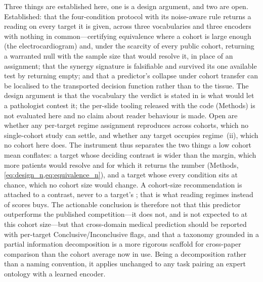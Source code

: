 Three things are established here, one is a design argument, and two
are open. Established: that the four-condition protocol with its
noise-aware rule returns a reading on every target it is given, across
three vocabularies and three encoders with nothing in common---certifying
equivalence where a cohort is large enough (the electrocardiogram) and,
under the scarcity of every public cohort, returning a warranted
null with the sample size that would resolve it, in place of an
assignment; that the synergy signature is falsifiable and survived its
one available test by returning empty; and that a predictor's collapse
under cohort transfer can be localised to the transported decision
function rather than to the tissue. The design argument is that the
vocabulary the verdict is stated in is what would let a pathologist
contest it; the per-slide tooling released with the code (Methods) is
not evaluated here and no claim about reader behaviour is made. Open
are whether any per-target regime assignment reproduces across cohorts,
which no single-cohort study can settle, and whether any target occupies
regime~(ii), which no cohort here does. The instrument thus separates
the two things a low cohort mean conflates: a target whose deciding
contrast is wider than the margin, which more patients would resolve and
for which it returns the number (Methods, \cref{eq:design_n,eq:equivalence_n}),
and a target whose every condition sits at chance, which no cohort size
would change. A cohort-size recommendation is attached to a contrast,
never to a target's \auroc{}; that is what reading regimes instead of
scores buys. The actionable conclusion is therefore not that this
predictor outperforms the published competition---it does not, and is
not expected to at this cohort size---but that cross-domain medical
prediction should be reported with per-target Conclusive/Inconclusive
flags, and that a taxonomy grounded in a partial information
decomposition is a more rigorous scaffold for cross-paper comparison
than the cohort average now in use. Being a decomposition rather than a
naming convention, it applies unchanged to any task pairing an expert
ontology with a learned encoder.
